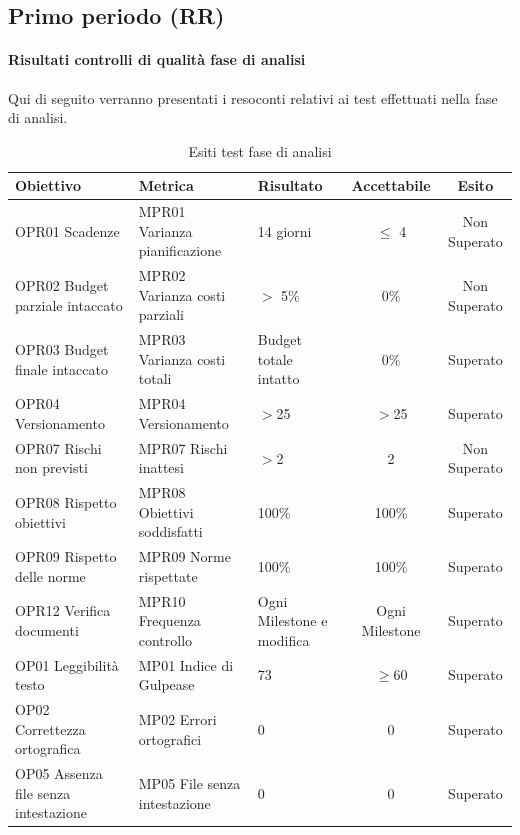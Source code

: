 \documentclass[../piano_di_qualifica.tex]{subfiles}
\begin{document}
\subsection{Primo periodo (RR)}
\label{sub:periodo-RR}
\paragraph{Risultati controlli di qualità fase di analisi}
Qui di seguito verranno presentati i resoconti relativi ai test effettuati nella fase di analisi. \par

\begin{table}[!ht]
	\centering
	\begin{tabular}{|p{4cm}|p{4cm}|l|c|c|}
		\hline
		\rowcolor{lightgray}
		\textbf{Obiettivo}            			& \textbf{Metrica}              & \textbf{Risultato}                    & \textbf{Accettabile} & \textbf{Esito} \\
		\hline
		OPR01 Scadenze		        			& MPR01 Varianza pianificazione & 14 giorni                             & $\leq$ 4           	& Non Superato   \\
		OPR02 Budget parziale intaccato        	& MPR02 Varianza costi parziali & $>$ 5\%								& 0\%                  	& Non Superato   \\
		OPR03 Budget finale intaccato        	& MPR03 Varianza costi totali   & Budget totale intatto					& 0\%                  	& Superato       \\
		OPR04 Versionamento						& MPR04 Versionamento			& $>$25									& $>$25					& Superato		 \\
		OPR07 Rischi non previsti				& MPR07 Rischi inattesi			& $>$2									& 2						& Non Superato	 \\
		OPR08 Rispetto obiettivi      			& MPR08 Obiettivi soddisfatti   & 100\%                                 & 100\%                	& Superato       \\
		OPR09 Rispetto delle norme   			& MPR09 Norme rispettate        & 100\%                                 & 100\%                	& Superato       \\
		OPR12 Verifica documenti      			& MPR10 Frequenza controllo     & Ogni Milestone e modifica         	& Ogni Milestone       	& Superato       \\
		OP01 Leggibilità testo       			& MP01 Indice di Gulpease      	& 73                                 & \(\ge 60\)           	& Superato       \\
		OP02 Correttezza ortografica 			& MP02 Errori ortografici      	& 0                                     & 0                    	& Superato       \\
		OP05 Assenza file senza intestazione	& MP05 File senza intestazione 	& 0										& 0						& Superato		 \\
		\hline
	\end{tabular}
	\caption{Esiti test fase di analisi}
\end{table}
\end{document}
